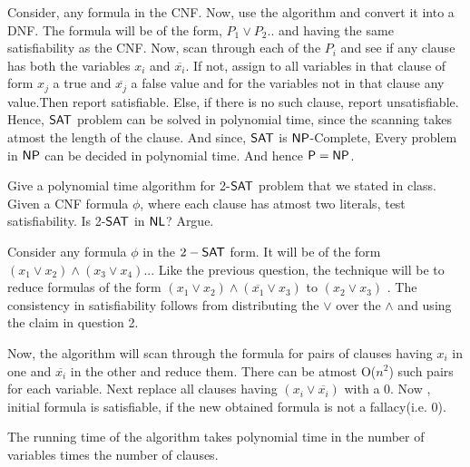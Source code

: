 \documentclass[12pt]{exam}
\begin{document}
\begin{questions}
\begin{solution}
Consider, any formula in the {\sc CNF}. Now, use the algorithm and convert it into a {\sc DNF}. The formula will be of the form, $P_{1} \vee P_{2} ..$
and having the same satisfiability as the {\sc CNF}. Now, scan through each of the $P_{i}$ and see if any clause has both the variables $x_{i}$ and $\overline{x_{i}}$.
If not, assign to all variables in that clause of form $x_{j}$ a true and $\overline{x_{j}}$ a false value and for the variables not in that clause any value.Then report satisfiable. Else, if there is no such clause, report unsatisfiable. \newline
Hence, ${\mathsf{SAT}}$ problem can be solved in polynomial time, since the scanning takes atmost the length of the clause. And since, ${\mathsf{SAT}}$ is ${\mathsf{NP}}$-Complete,
Every problem in ${\mathsf{NP}}$ can be decided in polynomial time. And hence ${\mathsf{P}} = {\mathsf{NP}}$.

\end{solution}


\question
Give a polynomial time algorithm for 2-${\mathsf{SAT}}$ problem that we stated in class. Given a CNF formula $\phi$, where each clause has atmost two literals, test satisfiability. Is 2-${\mathsf{SAT}}$ in ${\mathsf{NL}}$? Argue.

\begin{solution}
  Consider any formula $\phi$ in the $2-{\mathsf{SAT}}$ form. \newline
  It will be of the form $(x_{1} \vee x_{2}) \wedge (x_{3} \vee x_{4})..$. \newline
  Like the previous question, the technique will be to reduce formulas of the form $(x_{1} \vee x_{2}) \wedge (\overline{x_{1}} \vee x_{3})$ to
  $(x_{2} \vee x_{3})$ . The consistency in satisfiability follows from distributing the $\vee$ over the $\wedge$ and using the claim in question 2.\newline
  
  Now, the algorithm will scan through the formula for pairs of clauses having $x_{i}$ in one and $\overline{x_{i}}$ in the other and reduce them.
  There can be atmost O($n^2$) such pairs for each variable. Next replace all clauses having $(x_{i} \vee \overline{x_{i}})$ with a 0. 
  Now , initial formula is satisfiable, if the new obtained formula is not a fallacy(i.e. 0). \newline
  
  The running time of the algorithm takes polynomial time in the number of variables times the number of clauses.
  
  
\end{solution}



\end{questions}
\end{document}
